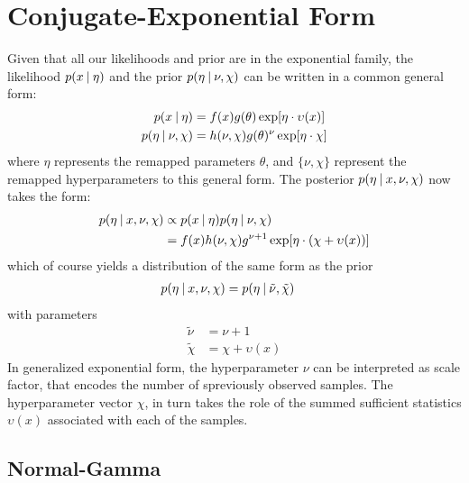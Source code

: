 \chapter{Conjugate-Exponential Form}

Given that all our likelihoods and prior are in the exponential family, the likelihood $p(x \:|\: \eta)$ and the prior $p(\eta \:|\: \nu, \chi)$ can be written in a common general form:
\begin{align}
  p(x \:|\: \eta) &= f(x) g(\theta) \exp[\eta \cdot \upsilon(x)] \\
  p(\eta \:|\: \nu, \chi) &= h(\nu, \chi) g(\theta)^\nu \exp [\eta \cdot \chi]
\end{align}
where $\eta$ represents the remapped parameters $\theta$, and $\{\nu, \chi\}$ represent the remapped hyperparameters to this general form. The posterior $p(\eta \:|\: x,\nu,\chi)$ now takes the form:
\begin{align}
  p(\eta \:|\: x,\nu,\chi) 
  &\propto 
  p(x \:|\: \eta)p(\eta \:|\: \nu,\chi) \\
  &=
  f(x) h(\nu, \chi) g^{\nu + 1} \exp [ \eta \cdot (\chi + \upsilon(x)) ]
\end{align}
which of course yields a distribution of the same form as the prior
\begin{align}
  p(\eta \:|\: x,\nu,\chi) 
  &=
  p(\eta \:|\: \tilde\nu, \tilde\chi)
\end{align}
with parameters
\begin{align}
  \tilde \nu
  &= 
  \nu + 1 \\
  \tilde \chi
  &=
  \chi + \upsilon(x)
\end{align}
In generalized exponential form, the hyperparameter $\nu$ can be interpreted as scale factor, that encodes the number of  spreviously observed samples. The hyperparameter vector $\chi$, in turn takes the role of the summed sufficient statistics $\upsilon(x)$ associated with each of the samples. 

\section{Normal-Gamma}

